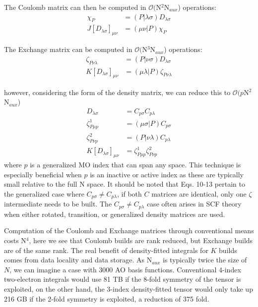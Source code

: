 \documentclass[aip,jcp,preprint,superscriptaddress,floatfix]{revtex4-1}
\begin{document}
The Coulomb matrix can then be computed in $\mathcal{O}($N$^2$N$_{aux}$) operations:
\begin{align}
\chi_P &= (P| \lambda \sigma) D_{ \lambda \sigma} \\
J[D_{ \lambda \sigma}]_{\mu \nu} &= (\mu \nu |P) \chi_P
\end{align}

The Exchange matrix can be computed in $\mathcal{O}($N$^3$N$_{aux}$) operations:
\begin{align}
\zeta_{P \nu\lambda} &= (P| \nu \sigma) D_{ \lambda \sigma} \\
K[D_{ \lambda \sigma}]_{\mu \nu} &= (\mu \lambda |P) \zeta_{P\nu\lambda} 
\end{align}

however, considering the form of the density matrix, we can reduce this to $\mathcal{O}(p$N$^2$N$_{aux}$)
\begin{align}
D_{\lambda \sigma} &= C_{p\sigma}C_{p\lambda}\\
\zeta^1_{P \mu p} &= (\mu \sigma | P) C_{ p \sigma} \\
\zeta^2_{P \nu p} &= (P| \nu \lambda) C_{ p \lambda} \\
K[D_{ \lambda \sigma}]_{\mu \nu} &= \zeta^1_{P \mu p} \zeta^2_{P \nu p}
\end{align}
where $p$ is a generalized MO index that can span any space.
This technique is especially beneficial when $p$ is an inactive or active index as these are typically small relative to the full N space.
It should be noted that Eqs. 10-13 pertain to the generalized case where $C_{p\sigma} \neq C_{p\lambda}$, if both $C$ matrices are identical, only one $\zeta$ intermediate needs to be built.
The $C_{p\sigma} \neq C_{p\lambda}$ case often arises in SCF theory when either rotated, transition, or generalized density matrices are used.

Computation of the Coulomb and Exchange matrices through conventional means costs N$^4$, here we see that Coulomb builds are rank reduced, but Exchange builds are of the same rank.
The real benefit of density-fitted integrals for $K$ builds comes from data locality and data storage.
As N$_{aux}$ is typically twice the size of $N$, we can imagine a case with 3000 AO basis functions.
Conventional 4-index two-electron integrals would use 81 TB if the 8-fold symmetry of the tensor is exploited, on the other hand, the 3-index density-fitted tensor would only take up 216 GB if the 2-fold symmetry is exploited, a reduction of 375 fold.





\end{document}
